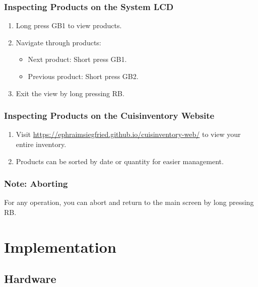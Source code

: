 \documentclass{article}
\begin{document}
\subsubsection{Inspecting Products on the System LCD}
\begin{enumerate}
	\item Long press GB1 to view products.
	\item Navigate through products:
	      \begin{itemize}
		      \item Next product: Short press GB1.
		      \item Previous product: Short press GB2.
	      \end{itemize}
	\item Exit the view by long pressing RB.
\end{enumerate}

\subsubsection{Inspecting Products on the Cuisinventory Website}
\begin{enumerate}
	\item Visit \url{https://ephraimsiegfried.github.io/cuisinventory-web/} to view your entire inventory.
	\item Products can be sorted by date or quantity for easier management.
\end{enumerate}
\subsubsection{Note: Aborting}
For any operation, you can abort and return to the main screen by long pressing RB.
\section{Implementation}
\subsection{Hardware}
\end{document}
